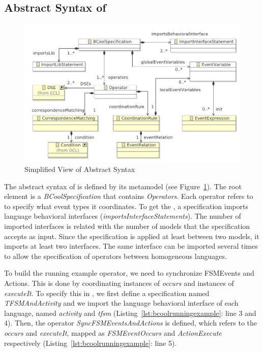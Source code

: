 \subsection{Abstract Syntax of \bcool}
\begin{figure}
	\center
	\includegraphics[width=.8\textwidth]{bcool/figs/BcoolMM}
	\caption{Simplified View of \bcool Abstract Syntax}
	\label{fig:bcool}
\end{figure}

The abstract syntax of \bcool is defined by its metamodel (see Figure~\ref{fig:bcool}). The root element is a \emph{BCoolSpecification} that contains \emph{Operators}. Each operator refers to \dse to specify what event types it coordinates. To get the \dse, a \bcool specification imports language behavioral interfaces (\emph{importsInterfaceStatements}). The number of imported interfaces is related with the number of models that the specification accepts as input. Since the \bcool specification is applied at least between two models, it imports at least two interfaces. The same interface can be imported several times to allow the specification of operators between homogeneous languages.   

To build the running example operator, we need to synchronize FSMEvents and Actions. This is done by coordinating instances of \dse \emph{occurs} and instances of \dse \emph{executeIt}. To specify this in \bcool, we first define a specification named \emph{TFSMAndActivity} and we import the language behavioral interface of each language, named \emph{activity} and \emph{tfsm} (Listing~\ref{lst:bcoolrunningexample}: line 3 and 4). Then, the operator \emph{SyncFSMEventsAndActions} is defined, which refers to the \dse \emph{occurs} and \emph{executeIt}, mapped as \emph{FSMEventOccurs} and \emph{ActionExecute} respectively (Listing~\ref{lst:bcoolrunningexample}: line 5). 
	
